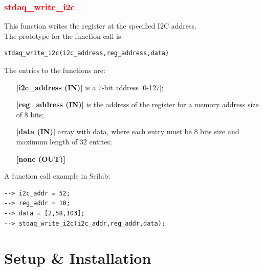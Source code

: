 \documentclass[letterpaper,10pt,english]{hitec}
\begin{document}
\subsubsection{\textcolor{red}{stdaq\_write\_i2c}}
This function writes the register at the specified I2C address. \\
The prototype for the function call is: 
\begin{verbatim}
stdaq_write_i2c(i2c_address,reg_address,data)
\end{verbatim}
The entries to the functions are:
\begin{itemize}
\item [\textbf{[i2c\_address (IN)]}] is a 7-bit address [0-127];
\item [\textbf{[reg\_address (IN)]}] is the address of the register for a memory address size of 8 bits;
\item [\textbf{[data (IN)]}] array with data, where each entry must be 8 bits size and maximum length of 32 entries;
\item [\textbf{[none (OUT)]}] 
\end{itemize}
A function call example in Scilab:
\begin{verbatim}
--> i2c_addr = 52;
--> reg_addr = 10;
--> data = [2,58,103];
--> stdaq_write_i2c(i2c_addr,reg_addr,data);
\end{verbatim}

\newpage

\section{Setup \& Installation}
\end{document}
